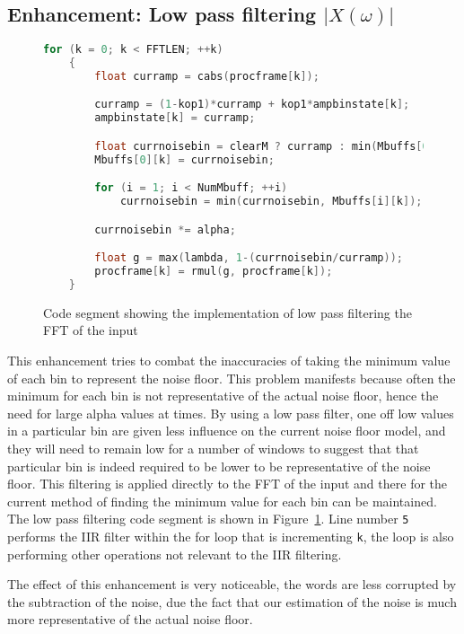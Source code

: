 \documentclass[11pt]{article} %
\begin{document}
\begin{raggedright}
\section{Enhancement: Low pass filtering $\lvert X(\omega) \rvert $} 
\label{sec:IIRamp}
\begin{figure}[htbp]
	\begin{center}
    \begin{lstlisting}[language = C]
for (k = 0; k < FFTLEN; ++k)
	{
		float curramp = cabs(procframe[k]); 

		curramp = (1-kop1)*curramp + kop1*ampbinstate[k];
		ampbinstate[k] = curramp;

		float currnoisebin = clearM ? curramp : min(Mbuffs[0][k], curramp);
		Mbuffs[0][k] = currnoisebin;

		for (i = 1; i < NumMbuff; ++i)
			currnoisebin = min(currnoisebin, Mbuffs[i][k]);

		currnoisebin *= alpha;

		float g = max(lambda, 1-(currnoisebin/curramp));
		procframe[k] = rmul(g, procframe[k]);
	}
    \end{lstlisting}
  \end{center}
	\caption{Code segment showing the implementation of low pass filtering the FFT of the input}
	\label{code:LPFxOMG}
\end{figure}

This enhancement tries to combat the inaccuracies of taking the minimum value of each bin to represent the noise floor. This problem manifests because often the minimum for each bin is not representative of the actual noise floor, hence the need for large alpha values at times. By using a low pass filter, one off low values in a particular bin are given less influence on the current noise floor model, and they will need to remain low for a number of windows to suggest that that particular bin is indeed required to be lower to be representative of the noise floor. This filtering is applied directly to the FFT of the input and there for the current method of finding the minimum value for each bin can be maintained. The low pass filtering code segment is shown in Figure~\ref{code:LPFxOMG}.  Line number \verb"5" performs the IIR filter within the for loop that is incrementing \verb"k", the loop is also performing other operations not relevant to the IIR filtering. 

The effect of this enhancement is very noticeable, the words are less corrupted by the subtraction of the noise, due the fact that our estimation of the noise is much more representative of the actual noise floor.   

\end{raggedright}
\end{document}
